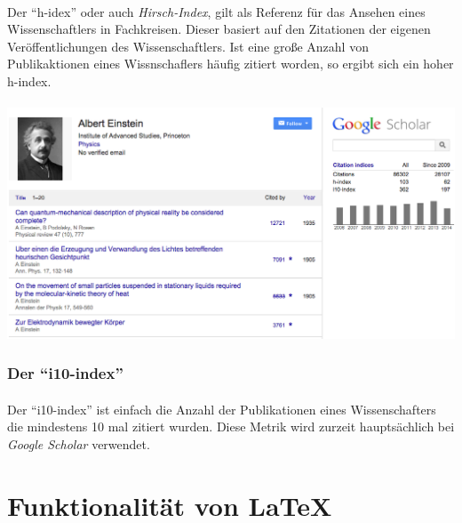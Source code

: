 \documentclass[10pt, a4paper]{article}
\begin{document}
\paragraph{}
Der \enquote{h-idex} oder auch \textit{Hirsch-Index}, gilt als Referenz für das Ansehen eines Wissenschaftlers in Fachkreisen. Dieser basiert auf den Zitationen der eigenen Veröffentlichungen des Wissenschaftlers. Ist eine große Anzahl von Publikaktionen eines Wissnschaflers häufig zitiert worden, so ergibt sich ein hoher h-index.\par
\paragraph{}
\begin{center}
\includegraphics[scale=0.3]{ae.png}
\end{center}\par

\subsubsection{Der \enquote{i10-index}}
\paragraph{}
Der \enquote{i10-index} ist einfach die Anzahl der Publikationen eines Wissenschafters die mindestens 10 mal zitiert wurden. Diese Metrik wird zurzeit hauptsächlich bei \textit{Google Scholar} verwendet.

\section{Funktionalität von \LaTeX}
\end{document}

